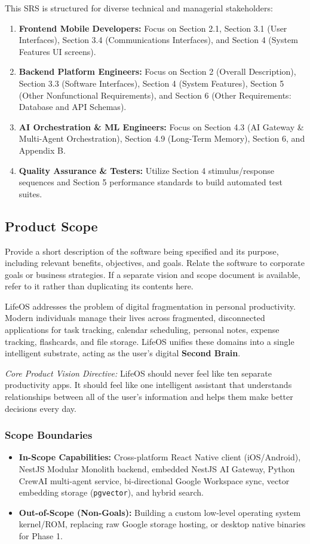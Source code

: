 \documentclass[11pt,a4paper]{article}
\begin{document}
This SRS is structured for diverse technical and managerial stakeholders:
\begin{enumerate}
    \item \textbf{Frontend Mobile Developers:} Focus on Section 2.1, Section 3.1 (User Interfaces), Section 3.4 (Communications Interfaces), and Section 4 (System Features UI screens).
    \item \textbf{Backend Platform Engineers:} Focus on Section 2 (Overall Description), Section 3.3 (Software Interfaces), Section 4 (System Features), Section 5 (Other Nonfunctional Requirements), and Section 6 (Other Requirements: Database and API Schemas).
    \item \textbf{AI Orchestration \& ML Engineers:} Focus on Section 4.3 (AI Gateway \& Multi-Agent Orchestration), Section 4.9 (Long-Term Memory), Section 6, and Appendix B.
    \item \textbf{Quality Assurance \& Testers:} Utilize Section 4 stimulus/response sequences and Section 5 performance standards to build automated test suites.
\end{enumerate}

\subsection{Product Scope}
Provide a short description of the software being specified and its purpose, including relevant benefits, objectives, and goals. Relate the software to corporate goals or business strategies. If a separate vision and scope document is available, refer to it rather than duplicating its contents here.

LifeOS addresses the problem of digital fragmentation in personal productivity. Modern individuals manage their lives across fragmented, disconnected applications for task tracking, calendar scheduling, personal notes, expense tracking, flashcards, and file storage. LifeOS unifies these domains into a single intelligent substrate, acting as the user's digital \textbf{Second Brain}.

\textit{Core Product Vision Directive:} LifeOS should never feel like ten separate productivity apps. It should feel like one intelligent assistant that understands relationships between all of the user's information and helps them make better decisions every day.

\subsubsection{Scope Boundaries}
\begin{itemize}
    \item \textbf{In-Scope Capabilities:} Cross-platform React Native client (iOS/Android), NestJS Modular Monolith backend, embedded NestJS AI Gateway, Python CrewAI multi-agent service, bi-directional Google Workspace sync, vector embedding storage (\texttt{pgvector}), and hybrid search.
    \item \textbf{Out-of-Scope (Non-Goals):} Building a custom low-level operating system kernel/ROM, replacing raw Google storage hosting, or desktop native binaries for Phase 1.
\end{itemize}
\end{document}
